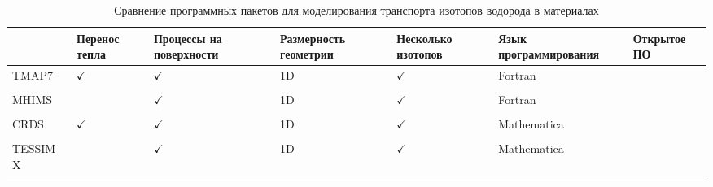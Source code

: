 \begin{table}[ht]
    \centering
    \begin{threeparttable}
        \caption{Сравнение программных пакетов для моделирования транспорта изотопов водорода в материалах}
        \label{tab:codes}
        \small
        \renewcommand{\arraystretch}{1.2}%
        \begin{tabularx}{\linewidth}{@{}>{\raggedright}X>{\centering\arraybackslash}X>{\centering\arraybackslash}X>{\centering\arraybackslash}X>{\centering\arraybackslash}X>{\centering\arraybackslash}X>{\centering\arraybackslash}X}
            \toprule
                                           & Перенос тепла & Процессы на поверхности & Размерность геометрии & Несколько изотопов & Язык программирования & Открытое ПО  \\
            \hline
            \hline
            TMAP7                          & $\checkmark$  & $\checkmark$            & 1D                    & $\checkmark$       & Fortran               &              \\
            \cite{GlenRLonghurst2008}      &               &                         &                       &                    &                       &              \\
            MHIMS                          &               & $\checkmark$            & 1D                    & $\checkmark$       & Fortran               &              \\
            \cite{Hodille2024}             &               &                         &                       &                    &                       &              \\
            CRDS                           & $\checkmark$  & $\checkmark$            & 1D                    & $\checkmark$       & Mathematica           &              \\
            \cite{Matveev2018}             &               &                         &                       &                    &                       &              \\
            TESSIM-X                       &               & $\checkmark$            & 1D                    & $\checkmark$       & Mathematica           &              \\
            \cite{Schmid2023_2}            &               &                         &                       &                    &                       &              \\

\end{tabularx}
\end{threeparttable}
\end{table}
